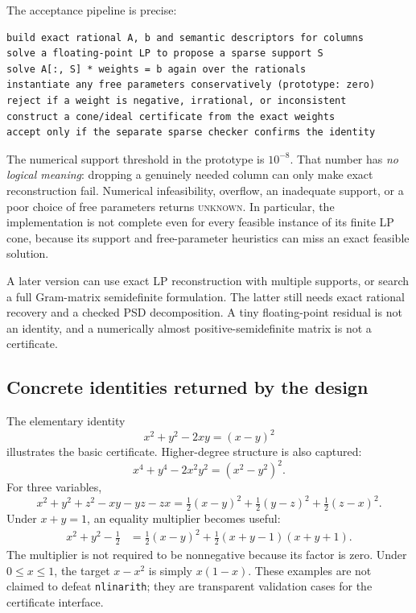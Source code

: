 \documentclass[11pt,letterpaper]{article}
\newcommand{\code}[1]{\texttt{#1}}
\newcommand{\Unknown}{\textsc{unknown}}
\theoremstyle{definition}\newtheorem{definition}[theorem]{Definition}
\theoremstyle{remark}\newtheorem{remark}[theorem]{Remark}
\begin{document}
The acceptance pipeline is precise:
\par\noindent
\begin{minipage}{\linewidth}
\begin{lstlisting}
build exact rational A, b and semantic descriptors for columns
solve a floating-point LP to propose a sparse support S
solve A[:, S] * weights = b again over the rationals
instantiate any free parameters conservatively (prototype: zero)
reject if a weight is negative, irrational, or inconsistent
construct a cone/ideal certificate from the exact weights
accept only if the separate sparse checker confirms the identity
\end{lstlisting}
\end{minipage}\par

The numerical support threshold in the prototype is $10^{-8}$. That number has \emph{no logical meaning}: dropping a genuinely needed column can only make exact reconstruction fail. Numerical infeasibility, overflow, an inadequate support, or a poor choice of free parameters returns \Unknown. In particular, the implementation is not complete even for every feasible instance of its finite LP cone, because its support and free-parameter heuristics can miss an exact feasible solution.

A later version can use exact LP reconstruction with multiple supports, or search a full Gram-matrix semidefinite formulation. The latter still needs exact rational recovery and a checked PSD decomposition. A tiny floating-point residual is not an identity, and a numerically almost positive-semidefinite matrix is not a certificate.

\subsection{Concrete identities returned by the design}
The elementary identity
\[
 x^2+y^2-2xy=(x-y)^2
\]
illustrates the basic certificate. Higher-degree structure is also captured:
\[
 x^4+y^4-2x^2y^2=(x^2-y^2)^2.
\]
For three variables,
\[
 x^2+y^2+z^2-xy-yz-zx
 =\tfrac12(x-y)^2+\tfrac12(y-z)^2+\tfrac12(z-x)^2.
\]
Under $x+y=1$, an equality multiplier becomes useful:
\begin{align*}
 x^2+y^2-\tfrac12
 &=\tfrac12(x-y)^2
   +\tfrac12(x+y-1)(x+y+1).
\end{align*}
The multiplier is not required to be nonnegative because its factor is zero. Under $0\le x\le1$, the target $x-x^2$ is simply $x(1-x)$. These examples are not claimed to defeat \code{nlinarith}; they are transparent validation cases for the certificate interface.
\end{document}
